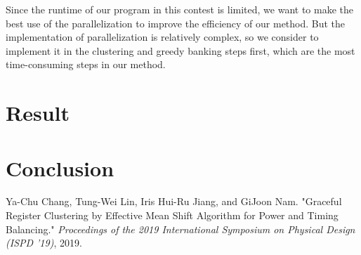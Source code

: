 \documentclass[12pt]{article}
\begin{document}
Since the runtime of our program in this contest is limited, we want to make the best use of the parallelization to improve the efficiency of our method. But the implementation of parallelization is relatively complex, so we consider to implement it in the clustering and greedy banking steps first, which are the most time-consuming steps in our method.


\section{Result}

\section{Conclusion}

\begin{thebibliography}{9}
    Ya-Chu Chang, Tung-Wei Lin, Iris Hui-Ru Jiang, and GiJoon Nam. "Graceful Register Clustering by Effective Mean Shift Algorithm for Power and Timing Balancing." \textit{Proceedings of the 2019 International Symposium on Physical Design (ISPD '19)}, 2019.
\end{thebibliography}
\end{document}
